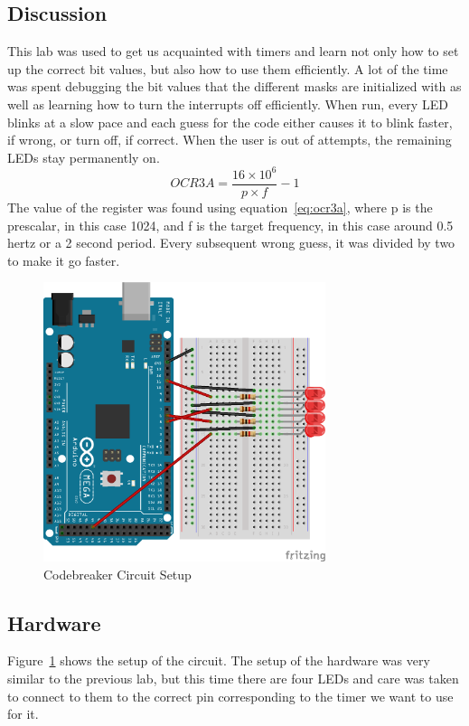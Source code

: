 \documentclass[12pt,titlepage]{article}
\begin{document}
\subsection{Discussion}
This lab was used to get us acquainted with timers and learn not only how to set up the correct bit values,
but also how to use them efficiently. A lot of the time was spent debugging the bit values that the different
masks are initialized with as well as learning how to turn the interrupts off efficiently. When run, every
LED blinks at a slow pace and each guess for the code either causes it to blink faster, if wrong, or turn
off, if correct. When the user is out of attempts, the remaining LEDs stay permanently on.
\begin{equation} \label{eq:ocr3a}
  OCR3A = \frac{16\times10^6}{p\times f} - 1
\end{equation}
The value of the register was found using equation~\ref{eq:ocr3a}, where p is the prescalar, in this case
1024, and f is the target frequency, in this case around 0.5 hertz or a 2 second period. Every subsequent
wrong guess, it was divided by two to make it go faster.
\begin{figure}[!htb]
  \centering
  \includegraphics[width=3.25in]{lab_3/schematic.png}
  \caption{Codebreaker Circuit Setup}\label{fig:lab_3}
\end{figure}
\subsection{Hardware}
Figure~\ref{fig:lab_3} shows the setup of the circuit. The setup of the hardware was very similar to
the previous lab, but this time there are four LEDs and care was taken to connect to them to the correct
pin corresponding to the timer we want to use for it.
\newpage
\end{document}
